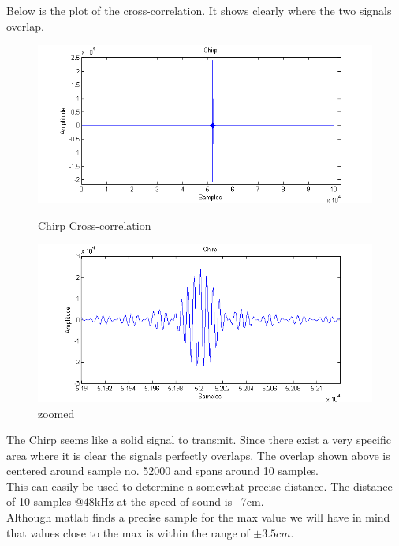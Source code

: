 Below is the plot of the cross-correlation. It shows clearly where the two signals overlap.\\
\begin{figure}[H]
\begin{minipage}[b]{0.49\linewidth}
\centering
\includegraphics[width=1\textwidth]{billeder/chirp_xcorr_fig}
\caption{Chirp Cross-correlation}
\label{fig:figure1}
\end{minipage}
\hspace{0.5cm}
\begin{minipage}[b]{0.49\linewidth}
\centering
\includegraphics[width=1\textwidth]{billeder/chirp_xcorr_fig_zoom}
\caption{zoomed}
\label{fig:figure2}
\end{minipage}
\end{figure}
The Chirp seems like a solid signal to transmit. Since there exist a very specific area where it is clear the signals perfectly overlaps. The overlap shown above is centered around sample no. 52000 and spans around 10 samples.\\
This can easily be used to determine a somewhat precise distance. The distance of 10 samples @48kHz at the speed of sound is ~7cm.\\
Although matlab finds a precise sample for the max value we will have in mind that values close to the max is within the range of $\pm 3.5cm$.\\
